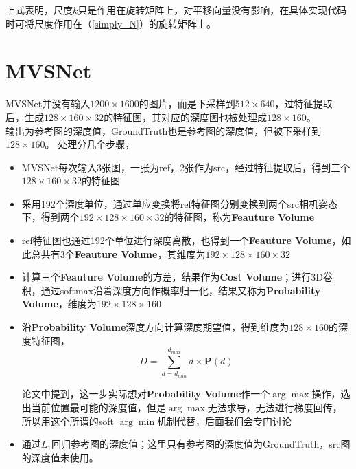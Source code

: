 \documentclass[hpyerref,UTF8,a4paper,titlepage,12pt,oneside]{ctexbook}
\theoremstyle{definition}
\begin{document}
	上式表明，尺度$k$只是作用在旋转矩阵上，对平移向量没有影响，在具体实现代码时可将尺度作用在（\ref{simply_N}）的旋转矩阵上。

\section{MVSNet}
	MVSNet并没有输入$1200 \times 1600$的图片，而是下采样到$512 \times 640$，过特征提取后，生成$128 \times 160 \times 32$的特征图，其对应的深度图也被处理成$128 \times 160$。\\

	输出为参考图的深度值，GroundTruth也是参考图的深度值，但被下采样到$128 \times 160$。 处理分几个步骤，

	\begin{itemize}
		\item MVSNet每次输入3张图，一张为ref，2张作为src，经过特征提取后，得到三个$128 \times 160 \times 32$的特征图
		
		\item 采用192个深度单位，通过单应变换将ref特征图分别变换到两个src相机姿态下，得到两个$192 \times 128 \times 160 \times 32$的特征图，称为\textbf{Feauture Volume}

		\item ref特征图也通过192个单位进行深度离散，也得到一个\textbf{Feauture Volume}，如此总共有3个\textbf{Feauture Volume}，其维度为$192 \times 128 \times 160 \times 32$

		\item 计算三个\textbf{Feauture Volume}的方差，结果作为\textbf{Cost Volume}；进行3D卷积，通过softmax沿着深度方向作概率归一化，结果又称为\textbf{Probability Volume}，维度为$192 \times 128 \times 160$

		\item 沿\textbf{Probability Volume}深度方向计算深度期望值，得到维度为$128 \times 160$的深度特征图，
			$$
				D = \sum_{d = d_{min}}^{d_{max}} d \times \mathbf{P}(d)
			$$

			论文中提到，这一步实际想对\textbf{Probability Volume}作一个$\arg\max$操作，选出当前位置最可能的深度值，但是$\arg\max$无法求导，无法进行梯度回传，所以用这个所谓的soft $\arg\min$机制代替，后面我们会专门讨论

		\item 通过$L_1$回归参考图的深度值；这里只有参考图的深度值为GroundTruth，src图的深度值未使用。
	\end{itemize}
	

	






\end{document}
